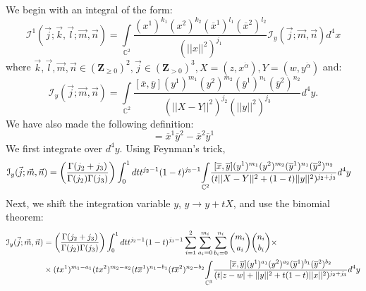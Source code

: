 \documentclass[a4paper,11pt]{article}
\begin{document}
We begin with an integral of the form:
\begin{equation}
    \mathcal{I}^1(\vec{j};\vec{k},\vec{l};\vec{m}, \vec{n}) = \underset{\mathbb{C}^2}{\int} \frac{ (x^1)^{k_1} (x^2)^{k_2}  (\overline{x}^1)^{l_1} (\overline{x}^2)^{l_2}}{(\vert \vert x \vert \vert^2)^{j_1}} \mathcal{I}_y (\vec{j};\vec{m}, \vec{n}) d^4x \label{eq:main type 1}
\end{equation}
where $\vec{k},\vec{l},\vec{m},\vec{n} \in (\mathbf{Z}_{\geq 0})^2, \vec{j} \in (\mathbf{Z}_{>0})^3, X = (z,x^{\dot{\alpha}}), Y = (w,y^{\dot{\alpha}})$ and:  
\begin{equation}
    \mathcal{I}_y (\vec{j};\vec{m}, \vec{n}) = \underset{\mathbb{C}^2}{\int} \frac{[\overline{x},\overline{y}] (y^1)^{m_1} (y^2)^{m_2} (\overline{y}^1)^{n_1} (\overline{y}^2)^{n_2}}{(\vert \vert X-Y \vert \vert^2)^{j_2} (\vert \vert y \vert \vert^2)^{j_3}} d^4y.
\end{equation}
We have also made the following definition: 
\begin{equation}
    [\overline{x},\overline{y}] = \overline{x}^1 \overline{y}^2 - \overline{x}^2 \overline{y}^1
\end{equation}
We first integrate over $d^4 y$. Using Feynman's trick,
\begingroup \allowdisplaybreaks \begin{align}
    \mathcal{I}_y (\vec{j};\vec{m}, \vec{n}) &= \bigg( \frac{\Gamma(j_2+j_3)}{\Gamma(j_2) \Gamma(j_3)} \bigg) \int_0^1 dt t^{j_2-1} (1-t)^{j_3-1} \underset{\mathbb{C}^2}{\int} \frac{[\overline{x},\overline{y}] (y^1)^{m_1} (y^2)^{m_2} (\overline{y}^1)^{n_1} (\overline{y}^2)^{n_2}}{(t\vert \vert X-Y \vert \vert^2 + (1-t) \vert \vert y \vert \vert^2)^{j_2+j_3}} d^4y \notag
\end{align} \endgroup
Next, we shift the integration variable $y$, $y \to y+tX$, and use the binomial theorem:
\begingroup \allowdisplaybreaks \begin{align}
    \mathcal{I}_y (\vec{j};\vec{m}, \vec{n}) &= \bigg( \frac{\Gamma(j_2+j_3)}{\Gamma(j_2) \Gamma(j_3)} \bigg) \int_0^1 dt t^{j_2-1} (1-t)^{j_3-1} \sum_{i=1}^{2} \sum_{a_i = 0}^{m_i} \sum_{b_i = 0}^{n_i} {m_i \choose a_i} {n_i \choose b_i} \times \label{eq. type 1 eq 2}\\
    &\times (tx^1)^{m_1-a_1}(tx^2)^{m_2-a_2} (t\overline{x}^1)^{n_1-b_1}(t\overline{x}^2)^{n_2-b_2} \underset{\mathbb{C}^3}{\int} \frac{[\overline{x},\overline{y}] (y^1)^{a_1} (y^2)^{a_2}(\overline{y}^1)^{b_1} (\overline{y}^2)^{b_2}}{(t\vert z-w \vert + \vert \vert y \vert \vert^2+t(1-t)\vert \vert x \vert \vert^2)^{j_2+j_3}} d^4y \notag
\end{align} \endgroup
\end{document}
